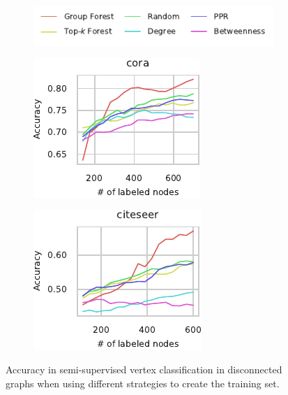 \begin{figure}[tb]
\centering
\begin{subfigure}[t]{\textwidth}
\centering
\includegraphics{sources/plots/el-clos/legend-node-class.pdf}
\end{subfigure}\smallskip

\begin{subfigure}[t]{.45\textwidth}
\centering
\includegraphics[width=.7\textwidth]{sources/plots/el-clos/node-class-cora.pdf}
\end{subfigure}\hfill
\begin{subfigure}[t]{.45\textwidth}
\centering
\includegraphics[width=.7\textwidth]{sources/plots/el-clos/node-class-citeseer.pdf}
\end{subfigure}
\caption{Accuracy in semi-supervised vertex classification in disconnected
graphs when using different strategies to create the training set.}
\label{fig:el-clos:vertex-class}
\end{figure}

